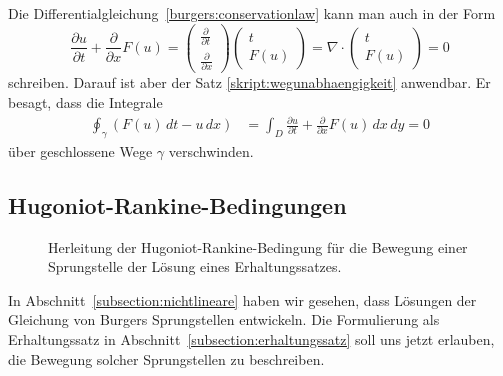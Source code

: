 Die Differentialgleichung~\eqref{burgers:conservationlaw} kann man auch
in der Form
\[
\frac{\partial u}{\partial t}
+
\frac{\partial }{\partial x} F(u)
=
\begin{pmatrix}
\frac{\partial}{\partial t}
\\
\frac{\partial}{\partial x}
\end{pmatrix}
\begin{pmatrix}t\\F(u)\end{pmatrix}
=
\nabla\cdot 
\begin{pmatrix}t\\F(u)\end{pmatrix}
=0
\]
schreiben.
Darauf ist aber der Satz \ref{skript:wegunabhaengigkeit} anwendbar.
Er besagt, dass die Integrale
\begin{align}
\oint_\gamma(
F(u)\,dt
-
u\,dx
)
&=
\int_D \frac{\partial u}{\partial t}+\frac{\partial}{\partial x}F(u)\,dx\,dy
=
0
\label{burgers:integral}
\end{align}
über geschlossene Wege $\gamma$ verschwinden.

\subsection{Hugoniot-Rankine-Bedingungen\label{subsection:hugnoniot}}
\begin{figure}
\centering
{}
\caption{Herleitung der Hugoniot-Rankine-Bedingung für die Bewegung einer
Sprungstelle der Lösung eines Erhaltungssatzes.
\label{burgers:hugoniot}}
\end{figure}
In Abschnitt~\ref{subsection:nichtlineare} haben wir gesehen, dass Lösungen
der Gleichung von Burgers Sprungstellen entwickeln.
Die Formulierung als Erhaltungssatz in
Abschnitt~\ref{subsection:erhaltungssatz} 
soll uns jetzt erlauben, die Bewegung solcher Sprungstellen zu beschreiben.

